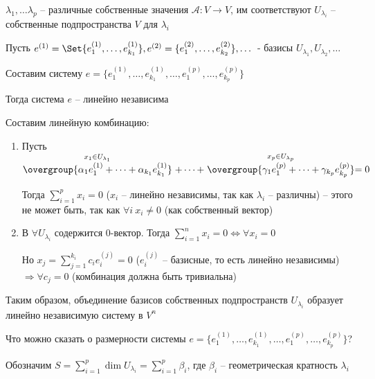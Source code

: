 \documentclass[12pt]{article}
\begin{document}
    \begin{MyTheorem}
        \Ths $\lambda_1, \dots \lambda_p$ -- различные собственные значения $\mathcal{A} : V \rightarrow V$,
        им соответствуют $U_{\lambda_i}$ -- собственные подпространства $V$ для $\lambda_i$

        Пусть $e^{(1)} = \Set{e^{(1)}_1, \dots, e^{(1)}_{k_1}}, e^{(2)} = \{e^{(2)}_1, \dots, e^{(2)}_{k_2}\}, \dots$ -
        базисы $U_{\lambda_1}, U_{\lambda_2}, \dots$

        Составим систему $e = \{e^{(1)}_1, \dots, e^{(1)}_{k_1}, \dots, e^{(p)}_1, \dots, e^{(p)}_{k_p}\}$

        Тогда система $e$ -- линейно независима
    \end{MyTheorem}

    \begin{MyProof}
        Составим линейную комбинацию:

        \begin{enumerate}
            \item Пусть $\stackrel{x_1 \in U_{\lambda_1}}{\overgroup{\alpha_1 e^{(1)}_1 + \dots + \alpha_{k_1} e^{(1)}_{k_1}}} + \dots +
            \stackrel{x_p \in U_{\lambda_p}}{\overgroup{\gamma_1 e^{(p)}_1 + \dots + \gamma_{k_p} e^{(p)}_{k_p}}} = 0$

            Тогда $\sum_{i=1}^p x_i = 0$ ($x_i$ -- линейно независимы, так как $\lambda_i$ -- различны) -- этого не может быть, так как $\forall i \ x_i \neq 0$ (как собственный вектор)

            \item В $\forall U_{\lambda_i}$ содержится $0$-вектор. Тогда $\sum_{i=1}^n x_i = 0 \Longleftrightarrow \forall x_i = 0$

            Но $x_j = \sum_{j=1}^{k_i} c_i e^{(j)}_i = 0$ ($e^{(j)}_i$ -- базисные, то есть линейно независимы) $\Longrightarrow \forall c_j = 0$ (комбинация должна быть тривиальна)
        \end{enumerate}
    \end{MyProof}

    \Nota Таким образом, объединение базисов собственных подпространств $U_{\lambda_i}$ образует линейно независимую систему в $V^n$

    Что можно сказать о размерности системы $e = \{e^{(1)}_1, \dots, e^{(1)}_{k_1}, \dots, e^{(p)}_1, \dots, e^{(p)}_{k_p}\}$?

    Обозначим $S = \sum_{i=1}^p \dim U_{\lambda_i} = \sum_{i=1}^p \beta_i$, где $\beta_i$ -- геометрическая кратность $\lambda_i$
\end{document}
